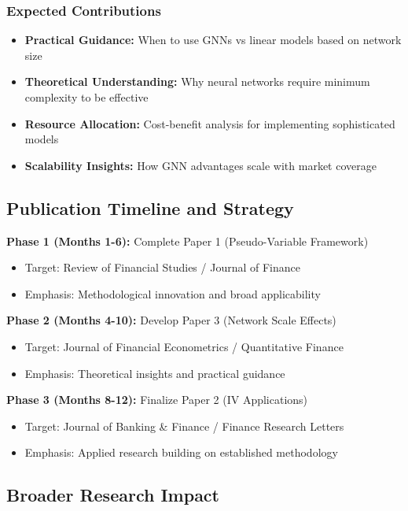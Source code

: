 \documentclass[12pt,a4paper]{article}
\begin{document}
\subsubsection{Expected Contributions}

\begin{itemize}
\item \textbf{Practical Guidance:} When to use GNNs vs linear models based on network size
\item \textbf{Theoretical Understanding:} Why neural networks require minimum complexity to be effective
\item \textbf{Resource Allocation:} Cost-benefit analysis for implementing sophisticated models
\item \textbf{Scalability Insights:} How GNN advantages scale with market coverage
\end{itemize}

\subsection{Publication Timeline and Strategy}

\textbf{Phase 1 (Months 1-6):} Complete Paper 1 (Pseudo-Variable Framework)
\begin{itemize}
\item Target: Review of Financial Studies / Journal of Finance
\item Emphasis: Methodological innovation and broad applicability
\end{itemize}

\textbf{Phase 2 (Months 4-10):} Develop Paper 3 (Network Scale Effects)  
\begin{itemize}
\item Target: Journal of Financial Econometrics / Quantitative Finance
\item Emphasis: Theoretical insights and practical guidance
\end{itemize}

\textbf{Phase 3 (Months 8-12):} Finalize Paper 2 (IV Applications)
\begin{itemize}
\item Target: Journal of Banking \& Finance / Finance Research Letters
\item Emphasis: Applied research building on established methodology
\end{itemize}

\subsection{Broader Research Impact}
\end{document}
